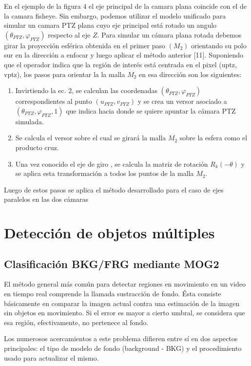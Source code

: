 \documentclass[12pt,a4paper]{article}
\begin{document}
En el ejemplo de la figura 4 el eje principal de la camara plana coincide con el de la camara fisheye. Sin embargo, podemos utilizar el modelo unificado para simular un camara PTZ plana cuyo eje principal está rotado un angulo $(\theta_{PTZ},\varphi_{PTZ})$ respecto al eje $Z$. Para simular un cámara plana rotada debemos girar la proyección esférica obtenida en el primer paso $(M_2)$ orientando su polo sur en la dirección a enfocar y luego aplicar el método anterior [11]. Suponiendo que el operador indica que la región de interés está centrada en el pixel (uptz, vptz), los pasos para orientar la la malla $M_2$ en esa dirección son los siguientes:

\begin{enumerate}
  \item Invirtiendo la ec. 2, se calculan las coordenadas $(\theta_{PTZ},\varphi_{PTZ})$ correspondientes al punto $(u_{PTZ},v_{PTZ})$ y se crea un versor  asociado a  $(\theta_{PTZ},\varphi_{PTZ},1)$ que indica hacia donde se quiere apuntar la cámara PTZ simulada.
  \item Se calcula el versor sobre el cual se girará la malla $M_2$ sobre la esfera como el producto cruz.
  \item Una vez conocido el eje de giro , se calcula la matriz de rotación $R_k(-\theta)$ y se aplica esta transformación a todos los puntos de la malla $M_2$.
\end{enumerate}

Luego de estos pasos se aplica el método desarrollado para el caso de ejes paralelos en las dos cámaras 

\pagebreak

\section{Detección de objetos múltiples}
\subsection{Clasificación BKG/FRG mediante MOG2}

El método general más común para detectar regiones en movimiento en un video en tiempo real comprende la llamada sustracción de fondo. Ésta consiste básicamente en comparar la imagen actual contra una estimación de la imagen sin objetos en movimiento. Si el error es mayor a cierto umbral, se considera que esa región, efectivamente, no pertenece al fondo.

Los numerosos acercamientos a este problema difieren entre sí en dos aspectos principales: el tipo de modelo de fondo (background - BKG) y el procedimiento usado para actualizar el mismo.
\end{document}
